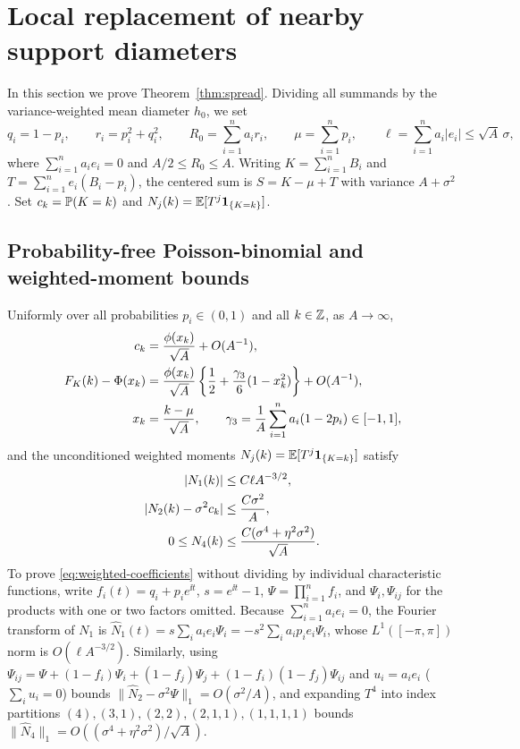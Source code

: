 \section{Local replacement of nearby support diameters}\label{sec:spread}

In this section we prove Theorem~\ref{thm:spread}. Dividing all summands by
the variance-weighted mean diameter $h_0$, we set
\[
 q_i=1-p_i,\qquad r_i=p_i^2+q_i^2,\qquad
 R_0=\sum_{i=1}^n a_i r_i,\qquad\mu=\sum_{i=1}^n p_i,
 \qquad\ell=\sum_{i=1}^n a_i|e_i|\le\sqrt A\,\sigma,
\]
where $\sum_{i=1}^n a_i e_i=0$ and $A/2\le R_0\le A$. Writing
$K=\sum_{i=1}^n B_i$ and $T=\sum_{i=1}^n e_i(B_i-p_i)$, the centered sum is
$S=K-\mu+T$ with variance $A+\sigma^2$. Set $c_k=\mathbb P(K=k)$ and
$N_j(k)=\mathbb E[T^j\mathbf1_{\{K=k\}}]$.

\subsection{Probability-free Poisson-binomial and weighted-moment bounds}

Uniformly over all probabilities $p_i\in(0,1)$ and all $k\in\mathbb Z$, as
$A\to\infty$,
\begin{align}
 c_k&=\frac{\phi(x_k)}{\sqrt A}+O(A^{-1}),\notag\\
 F_K(k)-\Phi(x_k)
   &=\frac{\phi(x_k)}{\sqrt A}
      \left\{\frac12+\frac{\gamma_3}{6}(1-x_k^2)\right\}
           +O(A^{-1}),                              \label{eq:pb-grid}\\
 x_k&=\frac{k-\mu}{\sqrt A},\qquad
 \gamma_3=\frac1A\sum_{i=1}^n a_i(1-2p_i)\in[-1,1],\notag
\end{align}
and the unconditioned weighted moments $N_j(k)=\mathbb E[T^j\mathbf1_{\{K=k\}}]$ satisfy
\begin{align}
 |N_1(k)|&\le C\ell A^{-3/2},\notag\\
 |N_2(k)-\sigma^2c_k|&\le \frac{C\sigma^2}{A},\notag\\
 0\le N_4(k)&\le \frac{C(\sigma^4+\eta^2\sigma^2)}{\sqrt A}.
                                                    \label{eq:weighted-coefficients}
\end{align}
To prove \eqref{eq:weighted-coefficients} without dividing by individual
characteristic functions, write $f_i(t)=q_i+p_i e^{\ii t}$, $s=e^{\ii t}-1$,
$\Psi=\prod_{i=1}^nf_i$, and $\Psi_i,\Psi_{ij}$ for the products with one or
two factors omitted. Because $\sum_{i=1}^n a_ie_i=0$, the Fourier transform
of $N_1$ is $\widehat N_1(t)=s\sum_i a_ie_i\Psi_i=-s^2\sum_i a_ip_ie_i\Psi_i$,
whose $L^1([-\pi,\pi])$ norm is $O(\ell A^{-3/2})$. Similarly, using
$\Psi_{ij}=\Psi+(1-f_i)\Psi_i+(1-f_j)\Psi_j+(1-f_i)(1-f_j)\Psi_{ij}$ and
$u_i=a_ie_i$ ($\sum_i u_i=0$) bounds $\|\widehat N_2-\sigma^2\Psi\|_1=O(\sigma^2/A)$,
and expanding $T^4$ into index partitions $(4),(3,1),(2,2),(2,1,1),(1,1,1,1)$
bounds $\|\widehat N_4\|_1=O((\sigma^4+\eta^2\sigma^2)/\sqrt A)$.


